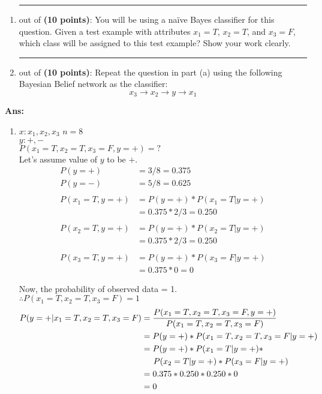 \documentclass{article}%
\begin{document}
\begin{enumerate}
    \begin{enumerate}
    \item \rule{0.5 in}{1 pt} out of \textbf{(10 points)}: 
				You will be using a na\"ive Bayes classifier for this question.
        Given a test example with attributes $x_1 = T$, $x_2 =
        T$, and $x_3 = F$, which class will be assigned to this test
        example? Show your work clearly.
        
    \item \rule{0.5 in}{1 pt} out of \textbf{(10 points)}: 
        Repeat the question in part (a) using the following Bayesian Belief
        network as the classifier:
\[{x_3} \to {x_2} \to y \to {x_1}\]
    \end{enumerate}

\textbf{Ans:} \\
\begin{enumerate}
\item $x : x_1, x_2, x_3$ \hspace{2cm} $ n=8 $ \\
$y : +, -$ \\
$P(x_1 = T, x_2 = T, x_3 = F, y = +) = ? $ \\
Let's assume value of $y$ to be $+$. \\



\begin{align*}
P(y=+) &= 3/8 = 0.375 \\
P(y=-) &= 5/8 = 0.625 \\\\
P(x_1=T, y=+) 	& = P(y=+) * P(x_1=T | y=+) \\
				& = 0.375 * 2/3 = 0.250 \\\\
P(x_2=T, y=+)	& = P(y=+) * P(x_2=T | y=+) \\
				& = 0.375 * 2/3 = 0.250 \\\\
P(x_3=T, y=+) 	& = P(y=+) * P(x_3=F | y=+) \\
				& = 0.375 * 0 = 0
\end{align*}

Now, the probability of observed data = 1. \\
$\therefore P(x_1=T, x_2=T, x_3=F) = 1 $
\begin{align*}
P(y=+ | x_1 = T, x_2 = T, x_3 = F) & = \frac{P(x_1=T, x_2=T, x_3=F, y=+)}{P(x_1=T, x_2=T, x_3=F)} \\
& = P(y=+) * P(x_1=T, x_2=T, x_3=F | y=+) \\
& = P(y=+) * P(x_1=T|y=+) * \\
& \hspace{0.5cm} P(x_2=T|y=+) * P(x_3=F|y=+) \\
& = 0.375 * 0.250 * 0.250 * 0 \\
& = 0
\end{align*}


\end{enumerate}
\end{enumerate}
\end{document}
